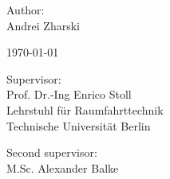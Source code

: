 \begin{titlepage}
\begin{center}
    \vspace{2cm}

    Author:\\
    Andrei Zharski

    \vspace{1cm}

    \today
\end{center}

\vfill

\noindent
\begin{minipage}[t]{0.48\textwidth}
    Supervisor:\\
    Prof. Dr.-Ing Enrico Stoll\\
    Lehrstuhl für Raumfahrttechnik\\
    Technische Universität Berlin
\end{minipage}%
\hfill
\begin{minipage}[t]{0.48\textwidth}
    \raggedleft
    Second supervisor:\\
    M.Sc. Alexander Balke\\
\end{minipage}


\end{titlepage}


